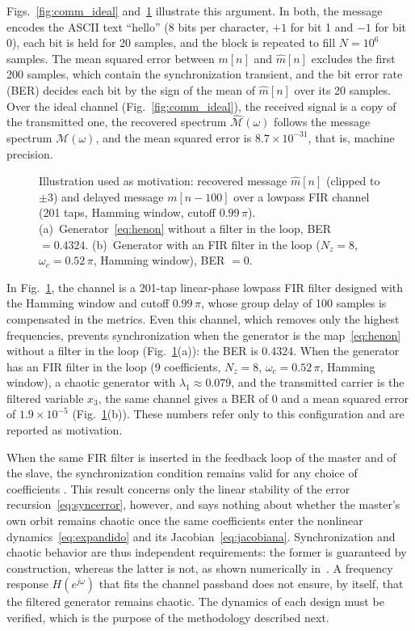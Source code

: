 \documentclass[journal]{IEEEtran}
\begin{document}
Figs.~\ref{fig:comm_ideal} and~\ref{fig:comm_bl} illustrate this argument.
In both, the message encodes the ASCII text ``hello'' (8 bits per character,
$+1$ for bit 1 and $-1$ for bit 0), each bit is held for 20 samples, and the
block is repeated to fill $N=10^{6}$ samples. The mean squared error between
$m[n]$ and $\hat{m}[n]$ excludes the first 200 samples, which contain the
synchronization transient, and the bit error rate (BER) decides each bit by
the sign of the mean of $\hat{m}[n]$ over its 20 samples. Over the ideal
channel (Fig.~\ref{fig:comm_ideal}), the received signal is a copy of the
transmitted one, the recovered spectrum $\hat{\mathcal{M}}(\omega)$ follows
the message spectrum $\mathcal{M}(\omega)$, and the mean squared error is
$8.7\times10^{-31}$, that is, machine precision.

\begin{figure}[!t]
\centering

\caption{Illustration used as motivation: recovered message $\hat{m}[n]$
(clipped to $\pm3$) and delayed message $m[n-100]$ over a lowpass FIR channel
(201 taps, Hamming window, cutoff $0.99\,\pi$). (a)~Generator~\eqref{eq:henon}
without a filter in the loop, BER $=0.4324$. (b)~Generator with an FIR filter
in the loop ($N_z=8$, $\omega_c=0.52\,\pi$, Hamming window), BER $=0$.}
\label{fig:comm_bl}
\end{figure}

In Fig.~\ref{fig:comm_bl}, the channel is a 201-tap linear-phase lowpass FIR
filter designed with the Hamming window and cutoff $0.99\,\pi$, whose group
delay of 100 samples is compensated in the metrics. Even this channel, which
removes only the highest frequencies, prevents synchronization when the
generator is the map~\eqref{eq:henon} without a filter in the loop
(Fig.~\ref{fig:comm_bl}(a)): the BER is 0.4324. When the generator has an
FIR filter in the loop (9 coefficients, $N_z=8$, $\omega_c=0.52\,\pi$, Hamming
window), a chaotic generator with $\lambda_1\approx0.079$, and the transmitted
carrier is the filtered variable $x_3$, the same
channel gives a BER of 0 and a mean squared error of $1.9\times10^{-5}$
(Fig.~\ref{fig:comm_bl}(b)). These numbers refer only to this configuration
and are reported as motivation.

When the same FIR filter is inserted in the feedback loop of the master and of the
slave, the synchronization condition remains valid for any choice of coefficients
\cite{Fontes2016,BorgesTese2026}. This result concerns only the linear stability of
the error recursion~\eqref{eq:syncerror}, however, and says nothing about
whether the master's own orbit remains chaotic once the same coefficients
enter the nonlinear dynamics~\eqref{eq:expandido} and its
Jacobian~\eqref{eq:jacobiana}. Synchronization and chaotic behavior are thus
independent requirements: the former is guaranteed by construction, whereas
the latter is not, as shown numerically
in~\cite{Borges2022sbrt,BorgesCSF2022,BorgesCNSNS2024}. A frequency response
$H(e^{j\omega})$ that fits the channel passband does not ensure, by itself,
that the filtered generator remains chaotic. The dynamics of each design must
be verified, which is the purpose of the methodology described next.
\end{document}
